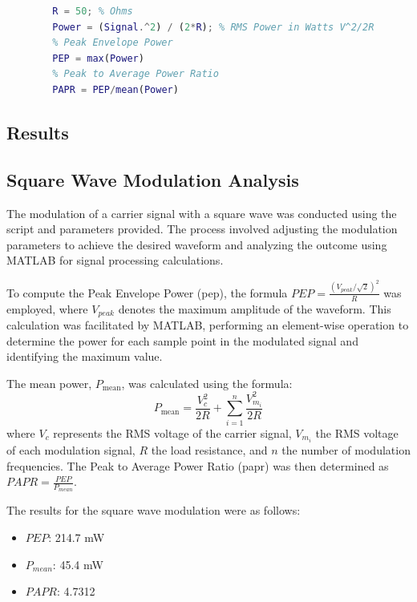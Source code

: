 \documentclass[a4paper, twocolumn]{article}
\begin{document}
        \begin{lstlisting}[language=Matlab, caption={Signal processing calculations}, label={lst:singnalcalcs}]
        % AM Power
        R = 50; % Ohms
        Power = (Signal.^2) / (2*R); % RMS Power in Watts V^2/2R
        % Peak Envelope Power
        PEP = max(Power)
        % Peak to Average Power Ratio
        PAPR = PEP/mean(Power)
        \end{lstlisting}

        \subsection{Results}
        \subsection*{Square Wave Modulation Analysis}
        The modulation of a carrier signal with a square wave was conducted using the script and parameters provided. The process involved adjusting the modulation parameters to achieve the desired waveform and analyzing the outcome using MATLAB for signal processing calculations.
        
        To compute the Peak Envelope Power (\gls{pep}), the formula $PEP = \frac{(V_{peak}/\sqrt{2})^2}{R}$ was employed, where $V_{peak}$ denotes the maximum amplitude of the waveform. This calculation was facilitated by MATLAB, performing an element-wise operation to determine the power for each sample point in the modulated signal and identifying the maximum value.
        
        The mean power, \(P_{\text{mean}}\), was calculated using the formula: 
        \[P_{\text{mean}} = \frac{V_c^2}{2R} + \sum_{i=1}^{n} \frac{V_{m_i}^2}{2R}\]
        where \(V_c\) represents the RMS voltage of the carrier signal, \(V_{m_i}\) the RMS voltage of each modulation signal, \(R\) the load resistance, and \(n\) the number of modulation frequencies. The Peak to Average Power Ratio (\gls{papr}) was then determined as $PAPR = \frac{PEP}{P_{mean}}$.
        
        The results for the square wave modulation were as follows:
        \begin{itemize}
            \item $PEP$: 214.7 mW
            \item $P_{mean}$: 45.4 mW
            \item $PAPR$: 4.7312
        \end{itemize}
            
\end{document}
